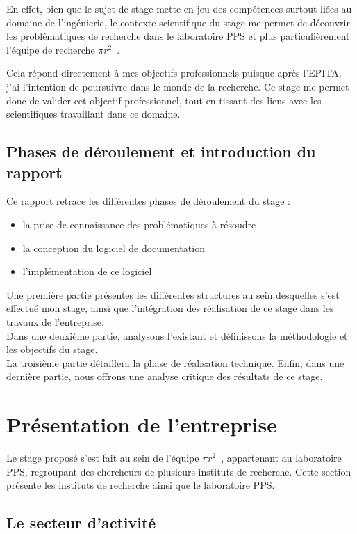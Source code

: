 \documentclass[a4paper, 11pt]{report}
\newcommand{\pir}[0]{\textbf{$\pi r^2$}~}
\newcommand{\epita}[0]{EPITA}
\begin{document}
  En effet, bien que le sujet de stage mette en jeu des compétences surtout
  liées au domaine de l'ingénierie, le contexte scientifique du stage me
  permet de découvrir les problématiques de recherche dans le laboratoire PPS
  et plus particulièrement l'équipe de recherche \pir.

  Cela répond directement à mes objectifs professionnels puisque après l'\epita,
  j'ai l'intention de poursuivre dans le monde de la recherche. Ce stage me
  permet donc de valider cet objectif professionnel, tout en tissant des liens
  avec les scientifiques travaillant dans ce domaine.

  \section{Phases de déroulement et introduction du rapport}
  Ce rapport retrace les différentes phases de déroulement du stage :
  \begin{itemize}
    \item la prise de connaissance des problématiques à résoudre
    \item la conception du logiciel de documentation
    \item l'implémentation de ce logiciel
  \end{itemize}

  Une première partie présentes les différentes structures au sein desquelles
  s'est effectué mon stage, ainsi que l'intégration des réalisation de ce stage
  dans les travaux de l'entreprise. \\
  Dans une deuxième partie, analysons l'existant et définissons la méthodologie
  et les objectifs du stage. \\
  La troisième partie détaillera la phase de réalisation technique.
  Enfin, dans une dernière partie, nous offrons une analyse critique des
  résultats de ce stage.

\chapter{Présentation de l'entreprise}
  Le stage proposé s'est fait au sein de l'équipe \pir, appartenant au
  laboratoire PPS, regroupant des chercheurs de plusieurs instituts de
  recherche. Cette section présente les instituts de recherche ainsi que le
  laboratoire PPS.
  \section{Le secteur d'activité}
\end{document}
